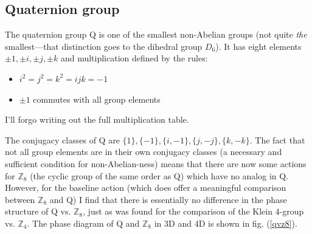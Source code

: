 \documentclass[9pt,twocolumn,twoside]{article}
\begin{document}
\subsection{Quaternion group}
The quaternion group Q is one of the smallest non-Abelian groups (not quite \textit{the} smallest---that distinction goes to the dihedral group $D_6$).  It has eight elements $\pm1,\pm i, \pm j, \pm k$ and multiplication defined by the rules:
\begin{itemize}
\item $i^2=j^2=k^2=ijk=-1$
\item $\pm1$ commutes with all group elements
\end{itemize}
I'll forgo writing out the full multiplication table.  

The conjugacy classes of Q are $\{1\},\{-1\},\{i,-1\},\{j,-j\},\{k,-k\}$.  The fact that not all group elements are in their own conjugacy classes (a necessary and sufficient condition for non-Abelian-ness) means that there are now some actions for $\mathbb{Z}_8$ (the cyclic group of the same order as Q) which have no analog in Q.  However, for the baseline action (which does offer a meaningful comparison between $\mathbb{Z}_8$ and Q) I find that there is essentially no difference in the phase structure of Q vs. $\mathbb{Z}_8$, just as was found for the comparison of the Klein 4-group vs. $\mathbb{Z}_4$.  The phase diagram of Q and $\mathbb{Z}_8$ in 3D and 4D is shown in fig. (\ref{qvz8}). 
\end{document}
